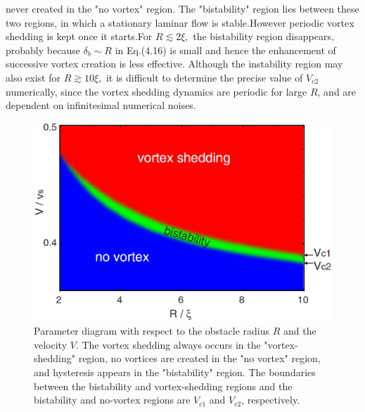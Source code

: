 \documentclass[12pt,a4paper]{report}
\begin{document}
never created in the "no vortex" region. The "bistability"
region lies between these two regions, in which a stationary laminar
flow is stable.However periodic vortex shedding is 
kept once it starts.For $R \lesssim 2 \xi,$ the bistability region
disappears, probably because $\delta_b \sim R$ in Eq.(4.16) is small and
hence the enhancement of successive vortex creation
is less effective. Although the instability region may also
exist for $R \gtrsim 10\xi,$ it is difficult to determine the precise
value of $V_{c2}$ numerically, since the vortex shedding dynamics
are periodic for large $R$, and are dependent on
infinitesimal numerical noises.
\begin{figure}[htbp]
\begin{center}
\includegraphics[scale=0.30, keepaspectratio]{4-5.eps}
\caption{
Parameter diagram with respect to the
obstacle radius $R$ and the velocity $V$. The vortex shedding always
occurs in the "vortex-shedding" region, no vortices are created in the
"no vortex" region, and hysteresis appears in the "bistability" region.
The boundaries between the bistability and vortex-shedding regions
and the bistability and no-vortex regions are $V_{c1}$ and $V_{c2}$, respectively.
}
\label{FIG:4-5}
\end{center}
\end{figure}
\end{document}
